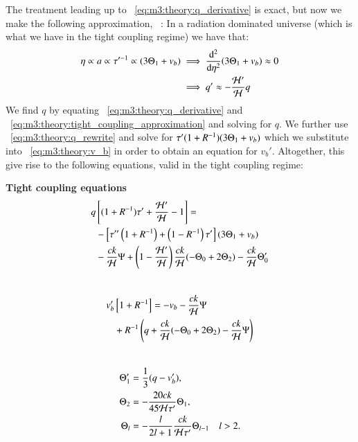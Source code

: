     The treatment leading up to ~\cref{eq:m3:theory:q_derivative} is exact, but now we make the following approximation, ~\cite{AST5220LectureNotes}: In a radiation dominated universe (which is what we have in the tight coupling regime) we have that:
    \begin{equation}\label{eq:m3:theory:tight_coupling_approximation}
        \begin{split}
        \eta\propto a\propto \tau'^{-1}\propto(3\Theta_1+v_b) &\implies \dv[2]{\eta}(3\Theta_1+v_b)\approx 0 \\
        &\implies q' \approx -\frac{\mathcal{H}'}{\mathcal{H}}q
        \end{split}
    \end{equation}
    We find $q$ by equating ~\cref{eq:m3:theory:q_derivative} and ~\cref{eq:m3:theory:tight_coupling_approximation} and solving for $q$. We further use ~\cref{eq:m3:theory:q_rewrite} and solve for $\tau'(1+R^{-1})(3\Theta_1+v_b)$ which we substitute into ~\cref{eq:m3:theory:v_b} in order to obtain an equation for $v_b'$. Altogether, this give rise to the following equations, valid in the tight coupling regime:
    \begin{tcolorbox}[
        width=1.025\linewidth,
        colback=blue!5!white,
        colframe=white
    ]
    \textbf{Tight coupling equations}
    \begin{equation}\label{eq:m3:theory:tight_coupling_q}
        \begin{split}
            q&\left[(1+R^{-1})\tau'+\frac{\mathcal{H}'}{\mathcal{H}}-1\right] = \\
            &- \left[\tau''\left(1+R^{-1}\right)+\left(1-R^{-1}\right)\tau'\right](3\Theta_1+v_b) \\
            &- \frac{ck}{\mathcal{H}}\Psi+\left(1-\frac{\mathcal{H}'}{\mathcal{H}}\right)\frac{ck}{\mathcal{H}}(-\Theta_0+2\Theta_2)-\frac{ck}{\mathcal{H}}\Theta_0'
        \end{split}
    \end{equation}
    \\
    \begin{equation}\label{eq:m3:theory:tight_coupling_v_b}
        \begin{split}
            v_b'&\left[1+R^{-1}\right] = -v_b-\frac{ck}{\mathcal{H}}\Psi\\
            &+R^{-1}\left(q+\frac{ck}{\mathcal{H}}(-\Theta_0+2\Theta_2)-\frac{ck}{\mathcal{H}}\Psi\right)
        \end{split}
    \end{equation}
    \\
    \begin{subequations}\label{eq:m3:theory:tight_coupling_all_poles}
        \begin{align}
            \Theta_1' &= \frac{1}{3}(q-v_b'), \label{eq:m3:theory:tight_coupling_monopole}\\
            \Theta_2 &= -\frac{20ck}{45\mathcal{H}\tau'}\Theta_1, \label{eq:m3:theory:tight_coupling_dipole}\\
            \Theta_l &= -\frac{l}{2l+1}\frac{ck}{\mathcal{H}\tau'}\Theta_{l-1} \quad l>2. \label{eq:m3:theory:tight_coupling_multipole}
        \end{align}
    \end{subequations}
    \end{tcolorbox}

